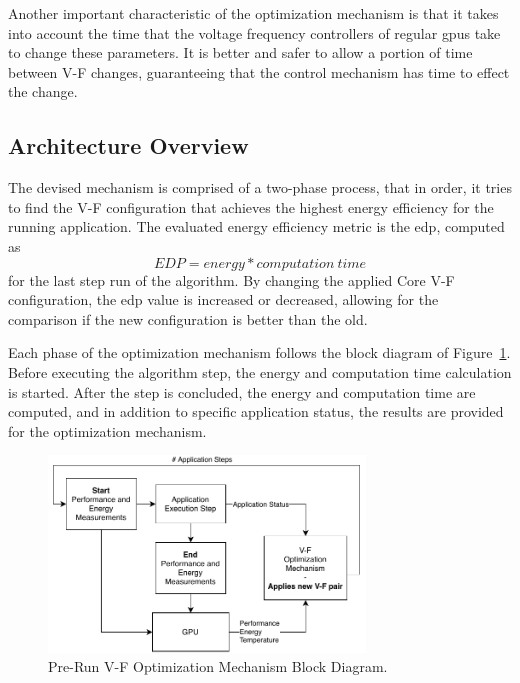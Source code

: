 Another important characteristic of the optimization mechanism is that it takes into account the time that the voltage frequency controllers of regular \acrshort{gpu}s take to change these parameters. It is better and safer to allow a portion of time between V-F changes, guaranteeing that the control mechanism has time to effect the change.


\subsection{Architecture Overview}

The devised mechanism is comprised of a two-phase process, that in order, it tries to find the V-F configuration that achieves the highest energy efficiency for the running application. The evaluated energy efficiency metric is the \acrshort{edp}, computed as 
\begin{equation}
	EDP=energy * computation \: time
	\label{eq:edp}
\end{equation}
for the last step run of the algorithm. By changing the applied Core V-F configuration, the \acrshort{edp} value is increased or decreased, allowing for the comparison if the new configuration is better than the old. 

Each phase of the optimization mechanism follows the block diagram of Figure~\ref{fig:detail_mech}. Before executing the algorithm step, the energy and computation time calculation is started. After the step is concluded, the energy and computation time are computed, and in addition to specific application status, the results are provided for the optimization mechanism.

\begin{figure}[htb]
  \centering
  \includegraphics[width=0.75\textwidth]{Figures/Optimization/opt_pre_run.pdf}
  \caption{Pre-Run V-F Optimization Mechanism Block Diagram.}
  \label{fig:detail_mech}
\end{figure}

